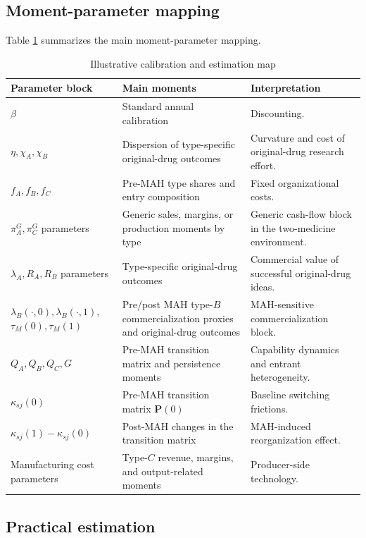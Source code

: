 \documentclass[12pt]{article}
\newcommand{\1}{\mathbf{1}}
\begin{document}
\subsection{Moment-parameter mapping}

Table \ref{tab:calibration} summarizes the main moment-parameter mapping.

\begin{table}[htbp]
\centering
\caption{Illustrative calibration and estimation map}
\label{tab:calibration}
\begin{tabular}{p{}p{}p{}}
\toprule
Parameter block & Main moments & Interpretation \\
\midrule
$\beta$ & Standard annual calibration & Discounting. \\
$\eta,\chi_A,\chi_B$ & Dispersion of type-specific original-drug outcomes & Curvature and cost of original-drug research effort. \\
$f_A,f_B,f_C$ & Pre-MAH type shares and entry composition & Fixed organizational costs. \\
$\pi_A^G,\pi_C^G$ parameters & Generic sales, margins, or production moments by type & Generic cash-flow block in the two-medicine environment. \\
$\lambda_A,R_A,R_B$ parameters & Type-specific original-drug outcomes & Commercial value of successful original-drug ideas. \\
$\lambda_B(\cdot,0),\lambda_B(\cdot,1),$\newline$\tau_M(0),\tau_M(1)$ & Pre/post MAH type-$B$ commercialization proxies and original-drug outcomes & MAH-sensitive commercialization block. \\
$Q_A,Q_B,Q_C,G$ & Pre-MAH transition matrix and persistence moments & Capability dynamics and entrant heterogeneity. \\
$\kappa_{sj}(0)$ & Pre-MAH transition matrix $\mathbf P(0)$ & Baseline switching frictions. \\
$\kappa_{sj}(1)-\kappa_{sj}(0)$ & Post-MAH changes in the transition matrix & MAH-induced reorganization effect. \\
Manufacturing cost parameters & Type-$C$ revenue, margins, and output-related moments & Producer-side technology. \\
\bottomrule
\end{tabular}
\end{table}

\subsection{Practical estimation}
\end{document}

